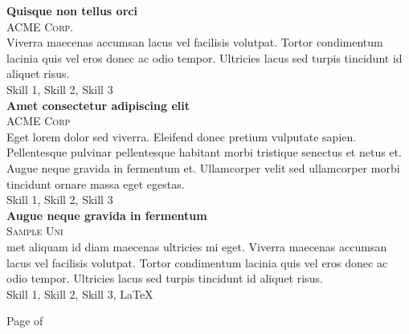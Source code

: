 \documentclass[onside]{article}
\begin{document}
{\begin{minipage}[t][\dimexpr\textheight-2\fboxrule-2\fboxsep\relax][t]{\dimexpr0.6\textwidth-2\fboxrule-2\fboxsep\relax}
\begin{justify}
        {\large \textbf{Quisque non tellus orci}} \\
        {\scshape{}\selectfont\footnotesize ACME Corp. } \\
        Viverra maecenas accumsan lacus vel facilisis volutpat. Tortor condimentum lacinia quis vel eros donec ac odio tempor. Ultricies lacus sed turpis tincidunt id aliquet risus. \\[1ex]
        Skill 1, Skill 2, Skill 3 \\
        
        {\large \textbf{Amet consectetur adipiscing elit}} \\
        {\scshape{}\selectfont\footnotesize ACME Corp } \\
        Eget lorem dolor sed viverra. Eleifend donec pretium vulputate sapien. Pellentesque pulvinar pellentesque habitant morbi tristique senectus et netus et. Augue neque gravida in fermentum et. Ullamcorper velit sed ullamcorper morbi tincidunt ornare massa eget egestas. \\[1ex]
        Skill 1, Skill 2, Skill 3 \\
        
        {\large \textbf{Augue neque gravida in fermentum}} \\
        {\scshape{}\selectfont\footnotesize Sample Uni } \\
        met aliquam id diam maecenas ultricies mi eget. Viverra maecenas accumsan lacus vel facilisis volutpat. Tortor condimentum lacinia quis vel eros donec ac odio tempor. Ultricies lacus sed turpis tincidunt id aliquet risus. \\[1ex]
        Skill 1, Skill 2, Skill 3, \LaTeX 
        \end{justify}
        \vfill%
        {\hfill\small{}\selectfont Page \thepage of \pageref{LastPage}\hfill}
    \end{minipage}
}
\hfill%
\end{document}
